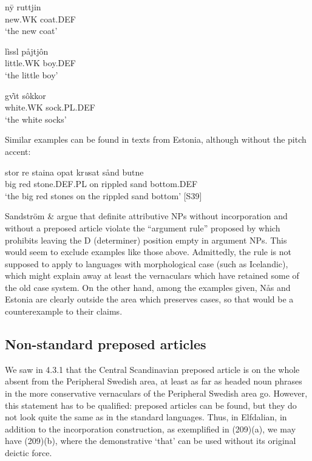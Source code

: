 
\ea\label{}
\gll n\={y}{\textasciigrave}  ruttjin\\
new.WK  coat.DEF\\
\glt ‘the new coat’
\z

\ea\label{}
\gll lìssl  påjtjôn\\
little.WK  boy.DEF\\
\glt ‘the little boy’
\z

\ea\label{}
\gll gv\`{\=\i}t  sôkkor\\
white.WK  sock.PL.DEF\\
\glt ‘the white socks’
\z

Similar examples can be found in texts from Estonia, although without the pitch accent:


\ea\label{}
\gll stor  re  staina  opat  kr\textit{u}sat  sånd  butne\\
big  red  stone.DEF.PL  on  rippled  sand  bottom.DEF\\
\glt ‘the big red stones on the rippled sand bottom’ [S39]
\z

Sandström \& \citet[110]{Holmberg2003} argue that definite attributive NPs without incorporation and without a preposed article violate the “argument rule” proposed by \citet{Delsing1993} which prohibits leaving the D (determiner) position empty in argument NPs. This would seem to exclude examples like those above. Admittedly, the rule is not supposed to apply to languages with morphological case (such as Icelandic), which might explain away at least the vernaculars which have retained some of the old case system. On the other hand, among the examples given, Nås and Estonia are clearly outside the area which preserves cases, so that would be a counterexample to their claims. 


\subsection{Non-standard preposed articles }
\label{bkm:Ref264372580}\label{bkm:Ref264372864}\label{bkm:Ref264372909}
We saw in 4.3.1 that the Central Scandinavian preposed article is on the whole absent from the Peripheral Swedish area, at least as far as headed noun phrases in the more conservative vernaculars of the Peripheral Swedish area go. However, this statement has to be qualified: preposed articles can be found, but they do not look quite the same as in the standard languages. Thus, in Elfdalian, in addition to the incorporation construction, as exemplified in (209)(a), we may have (209)(b), where the demonstrative  ‘that’ can be used without its original deictic force.

